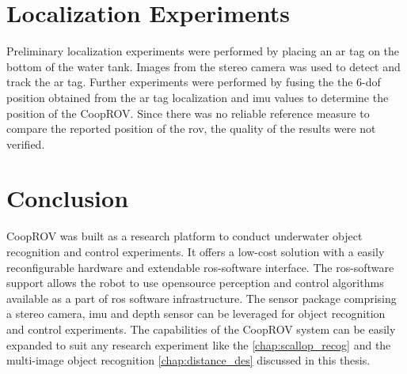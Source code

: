 \documentclass {udthesis}
\begin{document}
\section{Localization Experiments}

Preliminary localization experiments were performed by placing an \gls{ar} tag on the bottom of the water tank. Images from the stereo camera was used to detect and track the \gls{ar} tag. Further experiments were performed by fusing the the 6-\gls{dof} position obtained from the \gls{ar} tag localization and imu values to determine the position of the CoopROV. Since there was no reliable reference measure to compare the reported position of the \gls{rov}, the quality of the results were not verified.


\section{Conclusion}

CoopROV was built as a research platform to conduct underwater object recognition and control experiments. It offers a low-cost solution with a easily reconfigurable hardware and extendable \gls{ros}-software interface. The \gls{ros}-software support allows the robot to use opensource perception and control algorithms available as a part of \gls{ros} software infrastructure. The sensor package comprising a stereo camera, \gls{imu} and depth sensor can be leveraged for object recognition and control experiments. The capabilities of the CoopROV system can be easily expanded to suit any research experiment like the \ref{chap:scallop_recog} and the multi-image object recognition \ref{chap:distance_des} discussed in this thesis.

\printglossary[type=\acronymtype]                  
\end{document}
